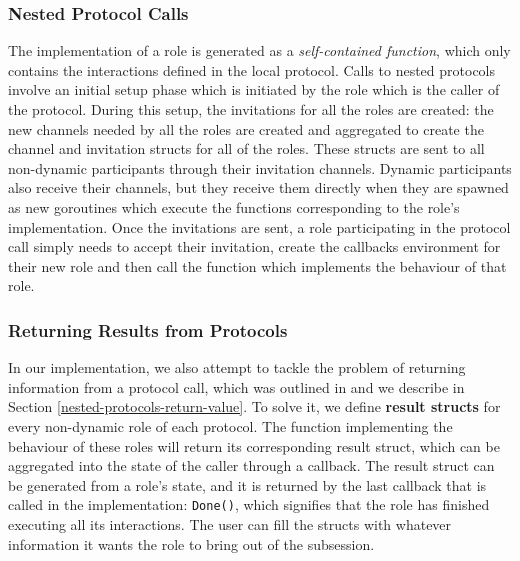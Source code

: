 \documentclass[12pt,twoside]{report}
\begin{document}
\subsubsection{Nested Protocol Calls}

The implementation of a role is generated as a \textit{self-contained function}, which only contains the interactions defined in the local protocol. Calls to nested protocols involve an initial setup phase which is initiated by the role which is the caller of the protocol. During this setup, the invitations for all the roles are created: the new channels needed by all the roles are created and aggregated to create the channel and invitation structs for all of the roles. These structs are sent to all non-dynamic participants through their invitation channels. Dynamic participants also receive their channels, but they receive them directly when they are spawned as new goroutines which execute the functions corresponding to the role's implementation. Once the invitations are sent, a role participating in the protocol call simply needs to accept their invitation, create the callbacks environment for their new role and then call the function which implements the behaviour of that role.

\subsubsection{Returning Results from Protocols}

In our implementation, we also attempt to tackle the problem of returning information from a protocol call, which was outlined in \cite{nestedprotocols} and we describe in Section \ref{nested-protocols-return-value}. To solve it, we define \textbf{result structs} for every non-dynamic role of each protocol. The function implementing the behaviour of these roles will return its corresponding result struct, which can be aggregated into the state of the caller through a callback. The result struct can be generated from a role's state, and it is returned by the last callback that is called in the implementation: \texttt{Done()}, which signifies that the role has finished executing all its interactions. The user can fill the structs with whatever information it wants the role to bring out of the subsession.\\
\end{document}
